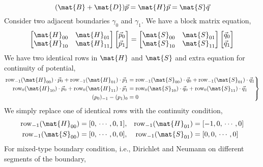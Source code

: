 \documentclass{jfm}
\begin{document}
\begin{equation}
(\mat{B}+\mat{D})\vec{p} =\mat{H}\vec{p} = \mat{S}\vec{q}
\end{equation}
Consider two adjacent boundaries $\gamma_0$ and $\gamma_1$.
We have a block matrix equation,
\begin{equation}
\begin{bmatrix}
\mat{H}_{00}&\mat{H}_{01}\\\mat{H}_{10}&\mat{H}_{11}
\end{bmatrix}
\begin{bmatrix}
\vec{p}_0\\\vec{p}_1
\end{bmatrix}
=\begin{bmatrix}
\mat{S}_{00}&\mat{S}_{01}\\\mat{S}_{10}&\mat{S}_{11}
\end{bmatrix}
\begin{bmatrix}
\vec{q}_0\\\vec{q}_1
\end{bmatrix}
\end{equation}
We have two identical rows in $\mat{H}$ and $\mat{S}$ 
and extra equation for continuity of potential,
\begin{equation}\left.\begin{aligned}
\mathrm{row}_{-1}(\mat{H}_{00})\cdot\vec{p}_0
+\mathrm{row}_{-1}(\mat{H}_{01})\cdot\vec{p}_1
&=\mathrm{row}_{-1}(\mat{S}_{00})\cdot\vec{q}_0
+\mathrm{row}_{-1}(\mat{S}_{01})\cdot\vec{q}_1\\
\mathrm{row}_{0}(\mat{H}_{10})\cdot\vec{p}_0
+\mathrm{row}_{0}(\mat{H}_{11})\cdot\vec{p}_1
&=\mathrm{row}_{0}(\mat{S}_{10})\cdot\vec{q}_0
+\mathrm{row}_{0}(\mat{S}_{11})\cdot\vec{q}_1\\
(p_0)_{-1}-(p_1)_{0}&=0
\end{aligned}\right\}\end{equation}
We simply replace one of identical rows with the continuity condition,
\begin{equation}\begin{aligned}
\mathrm{row}_{-1}(\mat{H}_{00}) &= [0, \,\cdots ,0 , 1],&
\mathrm{row}_{-1}(\mat{H}_{01}) &= [-1,0, \,\cdots ,0 ]\\
\mathrm{row}_{-1}(\mat{S}_{00}) &= [0, \,\cdots ,0 , 0],&
\mathrm{row}_{-1}(\mat{S}_{01}) &= [0,0, \,\cdots ,0 ]
\end{aligned}\end{equation}
For mixed-type boundary condition, i.e., Dirichlet and Neumann on different segments of the boundary,
\end{document}
